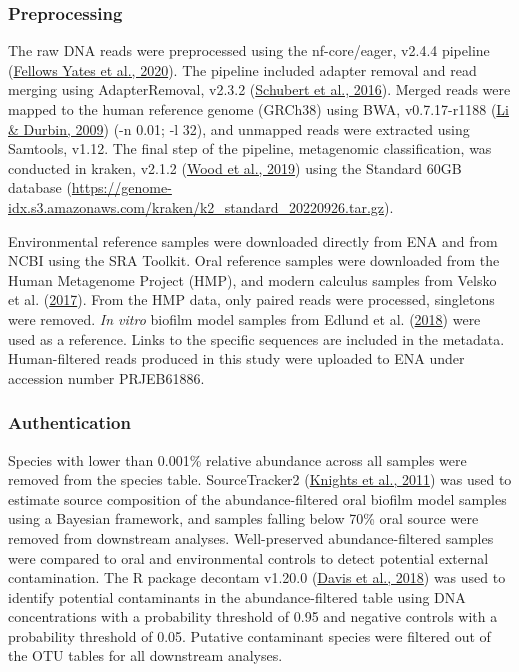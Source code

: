 \documentclass[
  b5paper,
]{book}
\begin{document}
\hypertarget{preprocessing}{%
\subsubsection{Preprocessing}\label{preprocessing}}

The raw DNA reads were preprocessed using the nf-core/eager, v2.4.4
pipeline (\protect\hyperlink{ref-yatesEAGER2020}{Fellows Yates et al.,
2020}). The pipeline included adapter removal and read merging using
AdapterRemoval, v2.3.2
(\protect\hyperlink{ref-AdapterRemovalv2}{Schubert et al., 2016}).
Merged reads were mapped to the human reference genome (GRCh38) using
BWA, v0.7.17-r1188 (\protect\hyperlink{ref-BWA}{Li \& Durbin, 2009}) (-n
0.01; -l 32), and unmapped reads were extracted using Samtools, v1.12.
The final step of the pipeline, metagenomic classification, was
conducted in kraken, v2.1.2 (\protect\hyperlink{ref-kraken2}{Wood et
al., 2019}) using the Standard 60GB database
(\url{https://genome-idx.s3.amazonaws.com/kraken/k2_standard_20220926.tar.gz}).

Environmental reference samples were downloaded directly from ENA and
from NCBI using the SRA Toolkit. Oral reference samples were downloaded
from the Human Metagenome Project (HMP), and modern calculus samples
from Velsko et al.
(\protect\hyperlink{ref-velskoDentalCalculus2017}{2017}). From the HMP
data, only paired reads were processed, singletons were removed.
\emph{In vitro} biofilm model samples from Edlund et al.
(\protect\hyperlink{ref-edlundUncoveringComplex2018}{2018}) were used as
a reference. Links to the specific sequences are included in the
metadata. Human-filtered reads produced in this study were uploaded to
ENA under accession number PRJEB61886.

\hypertarget{authentication}{%
\subsubsection{Authentication}\label{authentication}}

Species with lower than 0.001\% relative abundance across all samples
were removed from the species table. SourceTracker2
(\protect\hyperlink{ref-knightsSourceTracker2011}{Knights et al., 2011})
was used to estimate source composition of the abundance-filtered oral
biofilm model samples using a Bayesian framework, and samples falling
below 70\% oral source were removed from downstream analyses.
Well-preserved abundance-filtered samples were compared to oral and
environmental controls to detect potential external contamination. The R
package decontam v1.20.0 (\protect\hyperlink{ref-Rdecontam}{Davis et
al., 2018}) was used to identify potential contaminants in the
abundance-filtered table using DNA concentrations with a probability
threshold of 0.95 and negative controls with a probability threshold of
0.05. Putative contaminant species were filtered out of the OTU tables
for all downstream analyses.
\end{document}
